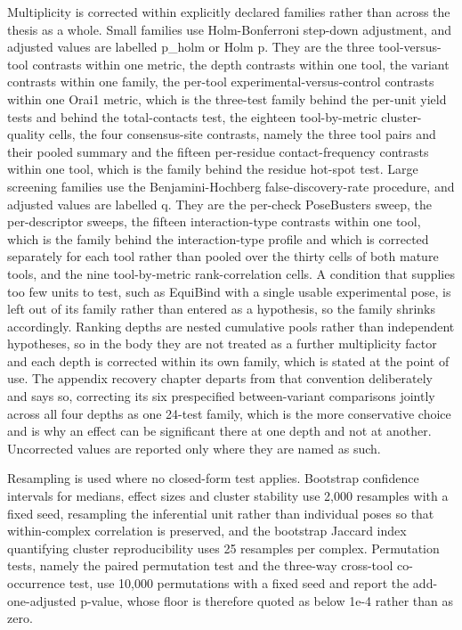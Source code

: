 Multiplicity is corrected within explicitly declared families rather than across the thesis as a whole. Small families use Holm-Bonferroni step-down adjustment, and adjusted values are labelled p\_holm or Holm p. They are the three tool-versus-tool contrasts within one metric, the depth contrasts within one tool, the variant contrasts within one family, the per-tool experimental-versus-control contrasts within one Orai1 metric, which is the three-test family behind the per-unit yield tests and behind the total-contacts test, the eighteen tool-by-metric cluster-quality cells, the four consensus-site contrasts, namely the three tool pairs and their pooled summary and the fifteen per-residue contact-frequency contrasts within one tool, which is the family behind the residue hot-spot test. Large screening families use the Benjamini-Hochberg false-discovery-rate procedure, and adjusted values are labelled q. They are the per-check PoseBusters sweep, the per-descriptor sweeps, the fifteen interaction-type contrasts within one tool, which is the family behind the interaction-type profile and which is corrected separately for each tool rather than pooled over the thirty cells of both mature tools, and the nine tool-by-metric rank-correlation cells. A condition that supplies too few units to test, such as EquiBind with a single usable experimental pose, is left out of its family rather than entered as a hypothesis, so the family shrinks accordingly. Ranking depths are nested cumulative pools rather than independent hypotheses, so in the body they are not treated as a further multiplicity factor and each depth is corrected within its own family, which is stated at the point of use. The appendix recovery chapter departs from that convention deliberately and says so, correcting its six prespecified between-variant comparisons jointly across all four depths as one 24-test family, which is the more conservative choice and is why an effect can be significant there at one depth and not at another. Uncorrected values are reported only where they are named as such.

Resampling is used where no closed-form test applies. Bootstrap confidence intervals for medians, effect sizes and cluster stability use 2,000 resamples with a fixed seed, resampling the inferential unit rather than individual poses so that within-complex correlation is preserved, and the bootstrap Jaccard index quantifying cluster reproducibility uses 25 resamples per complex. Permutation tests, namely the paired permutation test and the three-way cross-tool co-occurrence test, use 10,000 permutations with a fixed seed and report the add-one-adjusted p-value, whose floor is therefore quoted as below 1e-4 rather than as zero.

